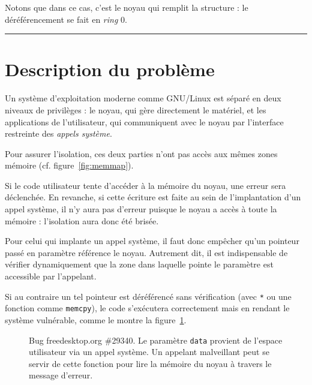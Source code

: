 Notons que dans ce cas, c'est le noyau qui remplit la structure : le
déréférencement se fait en \emph{ring} 0.

\begin{center}\rule{3in}{0.4pt}\end{center}



\section{Description du problème}


Un système d'exploitation moderne comme GNU/Linux est séparé en deux niveaux de
privilèges : le noyau, qui gère directement le matériel, et les applications de
l'utilisateur, qui communiquent avec le noyau par l'interface restreinte des
\emph{appels système}.

Pour assurer l'isolation, ces deux parties n'ont pas accès aux mêmes zones
mémoire (cf. figure~\ref{fig:memmap}).

Si le code utilisateur tente d'accéder à la mémoire du noyau, une erreur sera
déclenchée. En revanche, si cette écriture est faite au sein de l'implantation
d'un appel système, il n'y aura pas d'erreur puisque le noyau a accès à toute la
mémoire : l'isolation aura donc été brisée.

Pour celui qui implante un appel système, il faut donc empêcher qu'un pointeur
passé en paramètre référence le noyau. Autrement dit, il est indispensable de
vérifier dynamiquement que la zone dans laquelle pointe le paramètre est
accessible par l'appelant\cite{hardy88confused}.

Si au contraire un tel pointeur est déréférencé sans vérification (avec
\texttt{*} ou une fonction comme \texttt{memcpy}), le code s'exécutera
correctement mais en rendant le système vulnérable, comme le montre la
figure~\ref{fig:radeon-bug}.

\begin{figure}

  \caption{Bug freedesktop.org \#29340. Le paramètre \texttt{data} provient de
    l'espace utilisateur via un appel système. Un appelant malveillant peut se
    servir de cette fonction pour lire la mémoire du noyau à travers le message
    d'erreur.}

  \label{fig:radeon-bug}
\end{figure}


